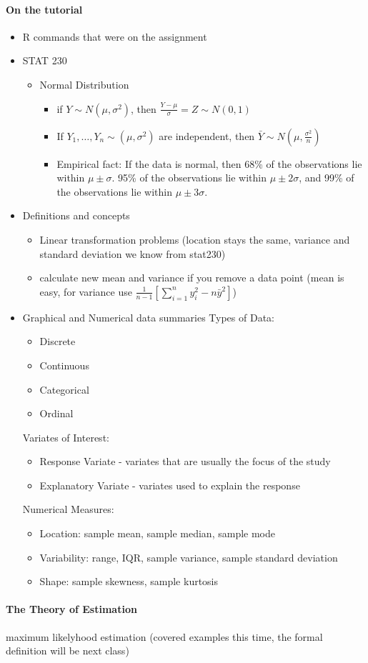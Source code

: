 \documentclass[10pt,letter]{article}
\theoremstyle{plain}
\theoremstyle{definition}
\begin{document}
\paragraph{On the tutorial}
\begin{itemize}
    \item R commands that were on the assignment
    \item STAT 230 
    \begin{itemize}
        \item Normal Distribution
        \begin{itemize}
            \item if $Y\sim N(\mu,\sigma^2)$, then $\frac{Y-\mu}{\sigma}=Z\sim N(0,1)$
            \item If $Y_1,\ldots,Y_n\sim(\mu,\sigma^2)$ are independent, then $\bar{Y}\sim N(\mu,\frac{\sigma^2}{n})$
            \item Empirical fact: If the data is normal, then 68\% of the observations lie within $\mu\pm\sigma$. 95\% of the observations lie within $\mu\pm2\sigma$, and 99\% of the observations lie within $\mu\pm3\sigma$. 
        \end{itemize}
    \end{itemize}
    \item Definitions and concepts 
    \begin{itemize}
        \item Linear transformation problems (location stays the same, variance and standard deviation we know from stat230) 
        \item calculate new mean and variance if you remove a data point (mean is easy, for variance use $\frac{1}{n-1}\left[\sum_{i=1}^ny_i^2-n\bar{y}^2\right]$)
    \end{itemize}
    \item Graphical and Numerical data summaries 
    Types of Data:
    \begin{itemize}
        \item Discrete 
        \item Continuous 
        \item Categorical 
        \item Ordinal
    \end{itemize}
    Variates of Interest: 
    \begin{itemize}
        \item Response Variate - variates that are usually the focus of the study
        \item Explanatory Variate - variates used to explain the response 
    \end{itemize}   
    Numerical Measures: 
    \begin{itemize}
        \item Location: sample mean, sample median, sample mode 
        \item Variability: range, IQR, sample variance, sample standard deviation 
        \item Shape: sample skewness, sample kurtosis 
    \end{itemize}
\end{itemize}

\paragraph{The Theory of Estimation}
maximum likelyhood estimation (covered examples this time, the formal definition will be next class)

 
\end{document}
